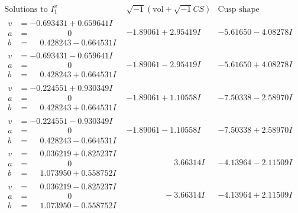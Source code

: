 \documentclass[1p]{elsarticle_modified}
\theoremstyle{definition}
\newcommand{\I}{\sqrt{-1}}
\begin{document}
$$\begin{array}{c|c|c}  
\text{Solutions to }I^v_{1}& \I (\text{vol} + \sqrt{-1}CS) & \text{Cusp shape}\\
 \hline 
\begin{aligned}
v &= -0.693431 + 0.659641 I \\
a &= \phantom{-0.000000 } 0 \\
b &= \phantom{-}0.428243 - 0.664531 I\end{aligned}
 & -1.89061 + 2.95419 I & -5.61650 - 4.08278 I \\ \hline\begin{aligned}
v &= -0.693431 - 0.659641 I \\
a &= \phantom{-0.000000 } 0 \\
b &= \phantom{-}0.428243 + 0.664531 I\end{aligned}
 & -1.89061 - 2.95419 I & -5.61650 + 4.08278 I \\ \hline\begin{aligned}
v &= -0.224551 + 0.930349 I \\
a &= \phantom{-0.000000 } 0 \\
b &= \phantom{-}0.428243 + 0.664531 I\end{aligned}
 & -1.89061 + 1.10558 I & -7.50338 - 2.58970 I \\ \hline\begin{aligned}
v &= -0.224551 - 0.930349 I \\
a &= \phantom{-0.000000 } 0 \\
b &= \phantom{-}0.428243 - 0.664531 I\end{aligned}
 & -1.89061 - 1.10558 I & -7.50338 + 2.58970 I \\ \hline\begin{aligned}
v &= \phantom{-}0.036219 + 0.825237 I \\
a &= \phantom{-0.000000 } 0 \\
b &= \phantom{-}1.073950 + 0.558752 I\end{aligned}
 & \phantom{-0.000000 -}3.66314 I & -4.13964 - 2.11509 I \\ \hline\begin{aligned}
v &= \phantom{-}0.036219 - 0.825237 I \\
a &= \phantom{-0.000000 } 0 \\
b &= \phantom{-}1.073950 - 0.558752 I\end{aligned}
 & \phantom{-0.000000 } -3.66314 I & -4.13964 + 2.11509 I \\ \hline\begin{aligned}

\end{aligned}
\end{array}$$
\end{document}
